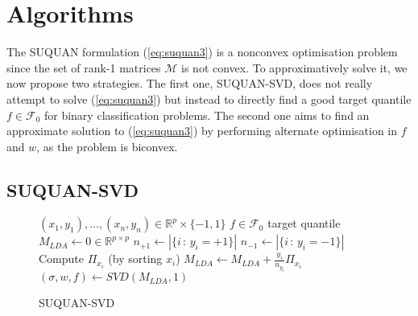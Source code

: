 \documentclass{article}
\newcommand{\RR}{\mathbb{R}} %
\newcommand{\Fcal}{\mathcal{F}}
\newcommand{\Mcal}{\mathcal{M}}
\begin{document}
\section{Algorithms}

The SUQUAN formulation (\ref{eq:suquan3}) is a nonconvex optimisation problem since the set of rank-1 matrices $\Mcal$ is not convex. To approximatively solve it, we now propose two strategies. The first one, SUQUAN-SVD, does not really attempt to solve (\ref{eq:suquan3}) but instead to directly find a good target quantile $f\in\Fcal_0$ for binary classification problems. The second one aims to find an approximate solution to (\ref{eq:suquan3}) by performing alternate optimisation in $f$ and $w$, as the problem is biconvex.

\subsection{SUQUAN-SVD}

\begin{wrapfigure}{R}{0.41\linewidth}
\begin{minipage}{0.96\linewidth}
\begin{algorithm}[H]
\caption{SUQUAN-SVD}
\label{alg:suquanSVD}
\begin{algorithmic}[1]
\REQUIRE  $(x_1,y_1) , \ldots , (x_n,y_n) \in \RR^p\times\{-1,1\}$
\ENSURE  $f\in\Fcal_0$ target quantile
\STATE $M_{LDA} \leftarrow 0 \in \RR^{p\times p}$
\STATE $n_{+1} \leftarrow |\{i\,:\,y_i = +1\}|$
\STATE $n_{-1} \leftarrow |\{i\,:\,y_i = -1\}|$
\STATE Compute $\Pi_{x_i}$ (by sorting $x_i$)
\STATE $M_{LDA} \leftarrow M_{LDA} + \frac{y_i}{n_{y_i}} \Pi_{x_i}$
\ENDFOR
\STATE $(\sigma,w,f) \leftarrow SVD(M_{LDA},1)$
\end{algorithmic}
\end{algorithm}
\end{minipage}
\end{wrapfigure}
\end{document}
